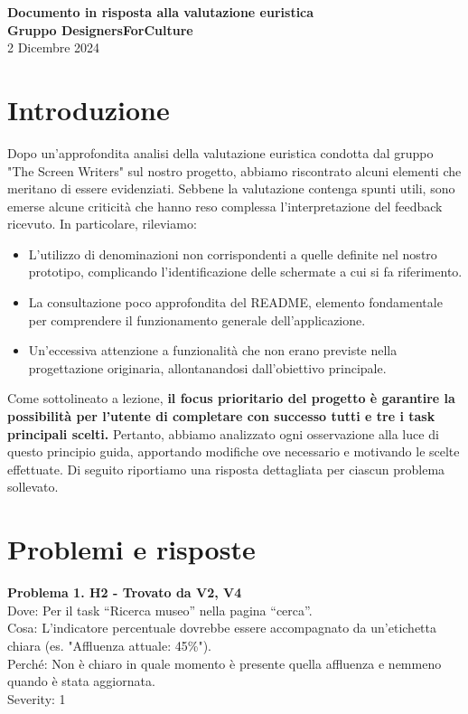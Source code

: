 \documentclass{article}
\begin{document}
\begin{center}
    \textbf{\LARGE Documento in risposta alla valutazione euristica} \\[1em]
    \textbf{\large Gruppo DesignersForCulture} \\[1.5em]
    {\large 2 Dicembre 2024}
\end{center}

\section*{Introduzione}

Dopo un'approfondita analisi della valutazione euristica condotta dal gruppo "The Screen Writers" sul nostro progetto, abbiamo riscontrato alcuni elementi che meritano di essere evidenziati. Sebbene la valutazione contenga spunti utili, sono emerse alcune criticità che hanno reso complessa l’interpretazione del feedback ricevuto. In particolare, rileviamo:
\begin{itemize}
    \item L’utilizzo di denominazioni non corrispondenti a quelle definite nel nostro prototipo, complicando l'identificazione delle schermate a cui si fa riferimento.
    \item La consultazione poco approfondita del README, elemento fondamentale per comprendere il funzionamento generale dell’applicazione.
    \item Un'eccessiva attenzione a funzionalità che non erano previste nella progettazione originaria, allontanandosi dall’obiettivo principale.
\end{itemize}

Come sottolineato a lezione, \textbf{il focus prioritario del progetto è garantire la possibilità per l’utente di completare con successo tutti e tre i task principali scelti.} Pertanto, abbiamo analizzato ogni osservazione alla luce di questo principio guida, apportando modifiche ove necessario e motivando le scelte effettuate. Di seguito riportiamo una risposta dettagliata per ciascun problema sollevato.

\section*{Problemi e risposte}

\noindent \textbf{Problema 1. H2 - Trovato da V2, V4} \\
Dove: Per il task “Ricerca museo” nella pagina “cerca”. \\
Cosa: L’indicatore percentuale dovrebbe essere accompagnato da un'etichetta chiara (es. "Affluenza attuale: 45\%"). \\
Perché: Non è chiaro in quale momento è presente quella affluenza e nemmeno quando è stata aggiornata. \\
Severity: 1
\end{document}

